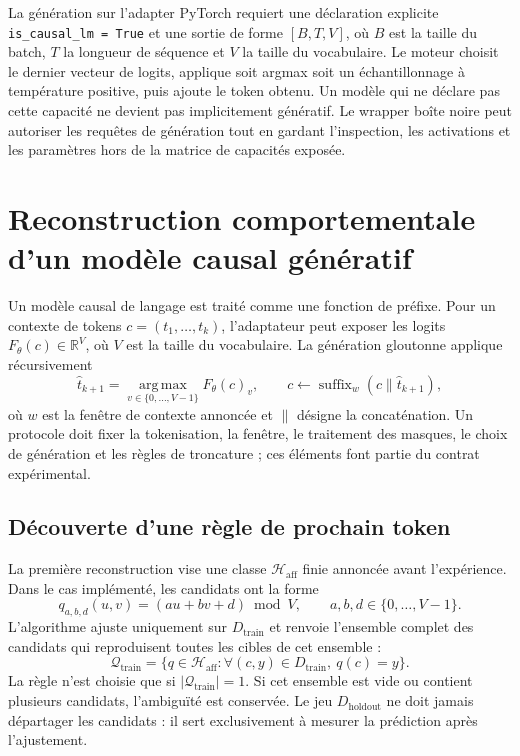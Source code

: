 \documentclass[11pt,a4paper]{article}
\begin{document}
La génération sur l'adapter PyTorch requiert une déclaration explicite \texttt{is\_causal\_lm = True} et une sortie de forme $[B,T,V]$, où $B$ est la taille du batch, $T$ la longueur de séquence et $V$ la taille du vocabulaire. Le moteur choisit le dernier vecteur de logits, applique soit argmax soit un échantillonnage à température positive, puis ajoute le token obtenu. Un modèle qui ne déclare pas cette capacité ne devient pas implicitement génératif. Le wrapper boîte noire peut autoriser les requêtes de génération tout en gardant l'inspection, les activations et les paramètres hors de la matrice de capacités exposée.


\section{Reconstruction comportementale d'un modèle causal génératif}
\label{sec:causal-lm-reconstruction}

Un modèle causal de langage est traité comme une fonction de préfixe. Pour un contexte de tokens $c=(t_1,\ldots,t_k)$, l'adaptateur peut exposer les logits $F_\theta(c)\in\mathbb{R}^{V}$, où $V$ est la taille du vocabulaire. La génération gloutonne applique récursivement
\[
\widehat t_{k+1}=\operatorname*{arg\,max}_{v\in\{0,\ldots,V-1\}} F_\theta(c)_v,\qquad
c\leftarrow\operatorname{suffix}_{w}(c\mathbin{\|}\widehat t_{k+1}),
\]
où $w$ est la fenêtre de contexte annoncée et $\|$ désigne la concaténation. Un protocole doit fixer la tokenisation, la fenêtre, le traitement des masques, le choix de génération et les règles de troncature ; ces éléments font partie du contrat expérimental.

\subsection{Découverte d'une règle de prochain token}
La première reconstruction vise une classe $\mathcal{H}_{\mathrm{aff}}$ finie annoncée avant l'expérience. Dans le cas implémenté, les candidats ont la forme
\[
q_{a,b,d}(u,v)=(a u+b v+d)\bmod V,\qquad a,b,d\in\{0,\ldots,V-1\}.
\]
L'algorithme ajuste uniquement sur $D_{\mathrm{train}}$ et renvoie l'ensemble complet des candidats qui reproduisent toutes les cibles de cet ensemble :
\[
\mathcal{Q}_{\mathrm{train}}=\{q\in\mathcal{H}_{\mathrm{aff}}:\forall(c,y)\in D_{\mathrm{train}},\ q(c)=y\}.
\]
La règle n'est choisie que si $|\mathcal{Q}_{\mathrm{train}}|=1$. Si cet ensemble est vide ou contient plusieurs candidats, l'ambiguïté est conservée. Le jeu $D_{\mathrm{holdout}}$ ne doit jamais départager les candidats : il sert exclusivement à mesurer la prédiction après l'ajustement.
\end{document}
